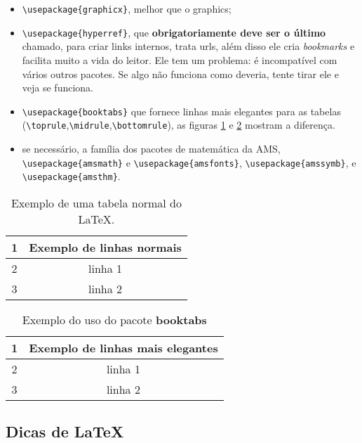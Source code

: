 \documentclass{article}
\begin{document}
\begin{itemize}
    \item \verb!\usepackage{graphicx}!, melhor que o graphics;
    \item \verb!\usepackage{hyperref}!, que \textbf{obrigatoriamente deve ser o último} chamado, para criar links internos, trata urls, além disso ele cria \textit{bookmarks} e facilita muito a vida do leitor. Ele tem um problema: é incompatível com vários outros pacotes. Se algo não funciona como deveria, tente tirar ele e veja se funciona.
    \item \verb!\usepackage{booktabs}! que fornece linhas mais elegantes para as tabelas (\verb!\toprule!,\verb!\midrule!,\verb!\bottomrule!), as figuras \ref{tab:tab2} e \ref{tab:tab1} mostram a diferença.
    \item se necessário, a família dos pacotes de matemática da AMS, \verb!\usepackage{amsmath}! e
    \verb!\usepackage{amsfonts}!, \verb!\usepackage{amssymb}!, e \verb!\usepackage{amsthm}!.
\end{itemize}

\begin{table}[htb]
    \centering
        \caption{Exemplo de uma tabela normal do \LaTeX .}
    \begin{tabular}{cc}
    \hline
        1 & Exemplo de linhas normais   \\
        \hline
        2 & linha 1\\
        3 & linha 2\\
        \hline
    \end{tabular}

    \label{tab:tab2}
\end{table}

\begin{table}[htb]
    \centering
        \caption{Exemplo do uso do pacote \textbf{booktabs} }
    \begin{tabular}{cc}
    \toprule
        1 & Exemplo de linhas mais elegantes   \\
        \midrule
        2 & linha 1\\
        3 & linha 2\\
        \bottomrule
    \end{tabular}

    \label{tab:tab1}
\end{table}

\subsection{Dicas de \LaTeX}
\end{document}
